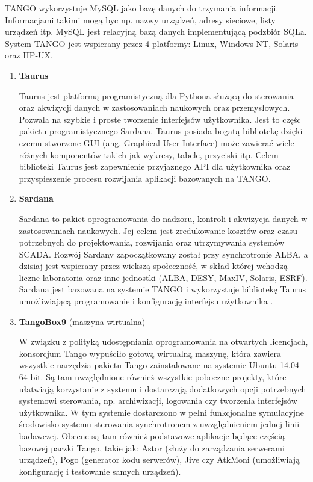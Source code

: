 \begin{enumerate}
	\hspace{2em}TANGO wykorzystuje MySQL jako bazę danych do trzymania informacji. Informacjami takimi mogą byc np. nazwy urządzeń, adresy sieciowe, listy urządzeń itp. MySQL jest relacyjną bazą danych implementującą podzbiór SQLa. System TANGO jest wspierany przez 4 platformy: Linux, Windows NT, Solaris oraz HP-UX.
	
	\begin{enumerate}
		\item \textbf{Taurus}
		
		\hspace{2em}Taurus jest platformą programistyczną dla Pythona służącą do sterowania oraz akwizycji danych w zastosowaniach naukowych oraz przemysłowych. Pozwala na szybkie i proste tworzenie interfejsów użytkownika. Jest to częśc pakietu programistycznego Sardana. Taurus posiada bogatą bibliotekę dzięki czemu stworzone GUI (ang. Graphical User Interface)  może zawierać wiele różnych komponentów takich jak wykresy, tabele, przyciski itp. Celem biblioteki Taurus jest zapewnienie przyjaznego API dla użytkownika oraz przyspieszenie procesu rozwijania aplikacji bazowanych na TANGO.
				
		
		\item \textbf{Sardana}
		
		\hspace{2em}Sardana to pakiet oprogramowania do nadzoru, kontroli i akwizycja danych w zastosowaniach naukowych. Jej celem jest zredukowanie kosztów oraz czasu potrzebnych do projektowania, rozwijania oraz utrzymywania systemów SCADA. Rozwój Sardany zapoczątkowany został przy synchrotronie ALBA, a dzisiaj jest wspierany przez wiekszą społeczność,  w skład której wchodzą liczne laboratoria oraz inne jednostki (ALBA, DESY, MaxIV, Solaris, ESRF).
		Sardana jest bazowana na systemie TANGO i wykorzystuje bibliotekę Taurus umożliwiającą programowanie i konfigurację interfejsu użytkownika \cite{Sardana}.
		
		\item \textbf{TangoBox9} (maszyna wirtualna)
		
		W związku z polityką udostępniania oprogramowania na otwartych licencjach, konsorcjum Tango wypuściło gotową wirtualną maszynę, która zawiera wszystkie narzędzia pakietu Tango zainstalowane na systemie Ubuntu 14.04 64-bit. Są tam uwzględnione również wszystkie poboczne projekty, które ułatwiają korzystanie z systemu i dostarczają dodatkowych opcji potrzebnych systemowi sterowania, np. archiwizacji, logowania czy tworzenia interfejsów użytkownika. W tym systemie dostarczono w pełni funkcjonalne symulacyjne środowisko systemu sterowania synchrotronem z uwzględnieniem jednej linii badawczej. Obecne są tam również podstawowe aplikacje będące częścią bazowej paczki Tango, takie jak: Astor (służy do zarządzania serwerami urządzeń), Pogo (generator kodu serwerów), Jive czy AtkMoni (umożliwiają konfigurację i testowanie samych urządzeń).
		

\end{enumerate}
\end{enumerate}
